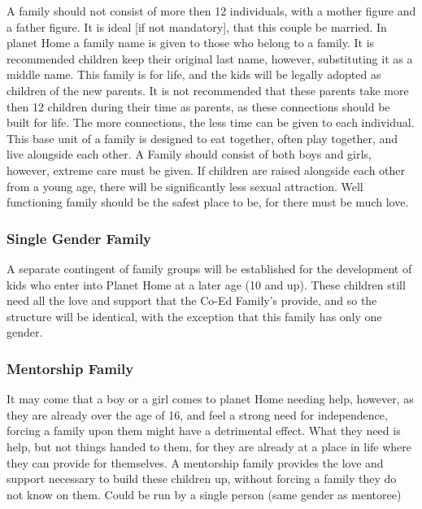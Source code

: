 \documentclass[CSHFoundation.tex]{subfiles}
\begin{document}
A family should not consist of more then 12 individuals, with a mother figure and a father figure. It is ideal [if not mandatory], that this couple be married. In planet Home a family name is given to those who belong to a family. It is recommended children keep their original last name, however, substituting it as a middle name. This family is for life, and the kids will be legally adopted as children of the new parents. It is not recommended that these parents take more then 12 children during their time as parents, as these connections should be built for life. The more connections, the less time can be given to each individual. This base unit of a family is designed to eat together, often play together, and live alongside each other. A Family should consist of both boys and girls, however, extreme care must be given. If children are raised alongside each other from a young age, there will be significantly less sexual attraction. Well functioning family should be the safest place to be, for there must be much love.



\subsubsection{Single Gender Family}



A separate contingent of family groups will be established for the development of kids who enter into Planet Home at a later age (10 and up). These children still need all the love and support that the Co-Ed Family’s provide, and so the structure will be identical, with the exception that this family has only one gender.



\subsubsection{Mentorship Family}



It may come that a boy or a girl comes to planet Home needing help, however, as they are already over the age of 16, and feel a strong need for independence, forcing a family upon them might have a detrimental effect. What they need is help, but not things handed to them, for they are already at a place in life where they can provide for themselves. A mentorship family provides the love and support necessary to build these children up, without forcing a family they do not know on them. Could be run by a single person (same gender as mentoree)
\end{document}
